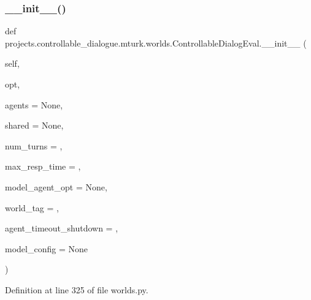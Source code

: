 \subsubsection{\texorpdfstring{\+\_\+\+\_\+init\+\_\+\+\_\+()}{\_\_init\_\_()}}
{\footnotesize\ttfamily def projects.\+controllable\+\_\+dialogue.\+mturk.\+worlds.\+Controllable\+Dialog\+Eval.\+\_\+\+\_\+init\+\_\+\+\_\+ (\begin{DoxyParamCaption}\item[{}]{self,  }\item[{}]{opt,  }\item[{}]{agents = {\ttfamily None},  }\item[{}]{shared = {\ttfamily None},  }\item[{}]{num\+\_\+turns = {},  }\item[{}]{max\+\_\+resp\+\_\+time = {},  }\item[{}]{model\+\_\+agent\+\_\+opt = {\ttfamily None},  }\item[{}]{world\+\_\+tag = {\ttfamily \textquotesingle{}\textquotesingle{}},  }\item[{}]{agent\+\_\+timeout\+\_\+shutdown = {},  }\item[{}]{model\+\_\+config = {\ttfamily None} }\end{DoxyParamCaption})}



Definition at line 325 of file worlds.\+py.


